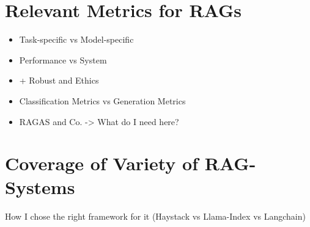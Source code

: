 \section{Relevant Metrics for RAGs}
\begin{itemize}
    \item Task-specific vs Model-specific
    \item Performance vs System
    \item + Robust and Ethics
    \item Classification Metrics vs Generation Metrics
    \item RAGAS and Co. -> What do I need here?
\end{itemize}

\section{Coverage of Variety of RAG-Systems}

How I chose the right framework for it (Haystack vs Llama-Index vs Langchain)


